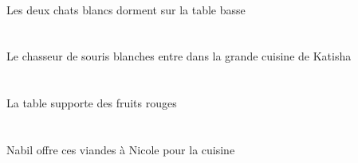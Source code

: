 \begin{exe}
   \DEFDuAbsG{}   \blancDDuG{}   \chatDDuAbsG{}    \DEFSgOblG{}   \basDSgG{}   \tableDSgOblG{}   \SURG{}  \dormirViPrsDDuG{} \\
 Les deux chats blancs dorment sur la table basse
\ex\glll
   \DEFSgAbs{}    \INDPlObl{}   \blancBPl{}   \sourisBPlObl{}   \DE{}   \chasseurCSgAbs{}    \DEFSgObl{}    \INDSgObl{}   \KatishaASgObl{}   \DE{}   \grandDSg{}   \cuisineDSgObl{}   \DANS{}  \entrerViPrsCSg{} \\
   \DEFSgAbsP{}    \INDPlOblP{}   \blancBPlP{}   \sourisBPlOblP{}   \DEP{}   \chasseurCSgAbsP{}    \DEFSgOblP{}    \INDSgOblP{}   \KatishaASgOblP{}   \DEP{}   \grandDSgP{}   \cuisineDSgOblP{}   \DANSP{}  \entrerViPrsCSgP{} \\
   \DEFSgAbsG{}    \INDPlOblG{}   \blancBPlG{}   \sourisBPlOblG{}   \DEG{}   \chasseurCSgAbsG{}    \DEFSgOblG{}    \INDSgOblG{}   \KatishaASgOblG{}   \DEG{}   \grandDSgG{}   \cuisineDSgOblG{}   \DANSG{}  \entrerViPrsCSgG{} \\
 Le chasseur de souris blanches entre dans la grande cuisine de Katisha
\ex\glll
   \DEFSgErg{}   \tableDSgErg{}   \INDPlAbs{}   \rougeAPl{}   \fruitAPlAbs{}  \supporterVtPrsAPl{} \\
   \DEFSgErgP{}   \tableDSgErgP{}   \INDPlAbsP{}   \rougeAPlP{}   \fruitAPlAbsP{}  \supporterVtPrsAPlP{} \\
   \DEFSgErgG{}   \tableDSgErgG{}   \INDPlAbsG{}   \rougeAPlG{}   \fruitAPlAbsG{}  \supporterVtPrsAPlG{} \\
 La table supporte des fruits rouges
\ex\glll
    \DEFSgObl{}   \cuisineDSgObl{}   \POUR{}   \INDSgErg{}   \NabilDSgErg{}    \INDSgDat{}   \NicoleBSgDat{}   \DEMPlAbs{}   \viandeAPlAbs{}  \offrirVdPrsAPl{} \\
    \DEFSgOblP{}   \cuisineDSgOblP{}   \POURP{}   \INDSgErgP{}   \NabilDSgErgP{}    \INDSgDatP{}   \NicoleBSgDatP{}   \DEMPlAbsP{}   \viandeAPlAbsP{}  \offrirVdPrsAPlP{} \\
    \DEFSgOblG{}   \cuisineDSgOblG{}   \POURG{}   \INDSgErgG{}   \NabilDSgErgG{}    \INDSgDatG{}   \NicoleBSgDatG{}   \DEMPlAbsG{}   \viandeAPlAbsG{}  \offrirVdPrsAPlG{} \\
 Nabil offre ces viandes à Nicole pour la cuisine
\ex\glll
   \DEFPlErg{}   \petitDPl{}   \garconDPlErg{}   \INDDuAbs{}   \blancBDu{}   \coussinBDuAbs{}  \acheterVtPrsBDu{} \\
   \DEFPlErgP{}   \petitDPlP{}   \garconDPlErgP{}   \INDDuAbsP{}   \blancBDuP{}   \coussinBDuAbsP{}  \acheterVtPrsBDuP{} \\
   \DEFPlErgG{}   \petitDPlG{}   \garconDPlErgG{}   \INDDuAbsG{}   \blancBDuG{}   \coussinBDuAbsG{}  \acheterVtPrsBDuG{} \\

\end{exe}
